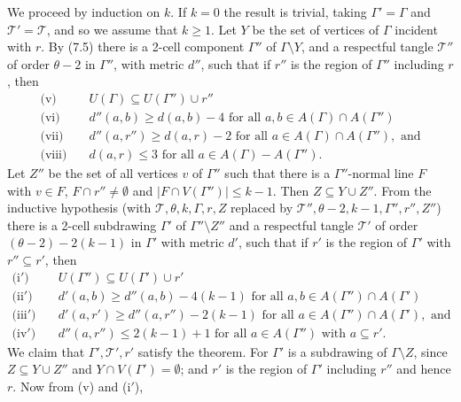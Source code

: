 We proceed by induction on $k$. If $k = 0$ the result is trivial, taking $\Gamma' = \Gamma$ and $\mathscr{T}' = \mathscr{T}$, and so we assume that $k \ge 1$. Let $Y$ be the set of vertices of $\Gamma$ incident with $r$. By (7.5) there is a 2-cell component $\Gamma''$ of $\Gamma \setminus Y$, and a respectful tangle $\mathscr{T}''$ of order $\theta - 2$ in $\Gamma''$, with metric $d''$, such that if $r''$ is the region of $\Gamma''$ including $r$, then
\begin{align*}
\text{(v)} \quad & U(\Gamma) \subseteq U(\Gamma'') \cup r'' \\
\text{(vi)} \quad & d''(a, b) \ge d(a, b) - 4 \text{ for all } a, b \in A(\Gamma) \cap A(\Gamma'') \\
\text{(vii)} \quad & d''(a, r'') \ge d(a, r) - 2 \text{ for all } a \in A(\Gamma) \cap A(\Gamma''), \text{ and} \\
\text{(viii)} \quad & d(a, r) \le 3 \text{ for all } a \in A(\Gamma) - A(\Gamma'').
\end{align*}
Let $Z''$ be the set of all vertices $v$ of $\Gamma''$ such that there is a $\Gamma''$-normal line $F$ with $v \in F$, $F \cap r'' \ne \emptyset$ and $|F \cap V(\Gamma'')| \le k - 1$. Then $Z \subseteq Y \cup Z''$. From the inductive hypothesis (with $\mathscr{T}, \theta, k, \Gamma, r, Z$ replaced by $\mathscr{T}'', \theta - 2, k - 1, \Gamma'', r'', Z''$) there is a 2-cell subdrawing $\Gamma'$ of $\Gamma'' \setminus Z''$ and a respectful tangle $\mathscr{T}'$ of order $(\theta - 2) - 2(k - 1)$ in $\Gamma'$ with metric $d'$, such that if $r'$ is the region of $\Gamma'$ with $r'' \subseteq r'$, then
\begin{align*}
\text{(i$'$)} \quad & U(\Gamma'') \subseteq U(\Gamma') \cup r' \\
\text{(ii$'$)} \quad & d'(a, b) \ge d''(a, b) - 4(k - 1) \text{ for all } a, b \in A(\Gamma'') \cap A(\Gamma') \\
\text{(iii$'$)} \quad & d'(a, r') \ge d''(a, r'') - 2(k - 1) \text{ for all } a \in A(\Gamma'') \cap A(\Gamma'), \text{ and} \\
\text{(iv$'$)} \quad & d''(a, r'') \le 2(k - 1) + 1 \text{ for all } a \in A(\Gamma'') \text{ with } a \subseteq r'.
\end{align*}
We claim that $\Gamma', \mathscr{T}', r'$ satisfy the theorem. For $\Gamma'$ is a subdrawing of $\Gamma \setminus Z$, since $Z \subseteq Y \cup Z''$ and $Y \cap V(\Gamma') = \emptyset$; and $r'$ is the region of $\Gamma'$ including $r''$ and hence $r$. Now from (v) and (i$'$),
